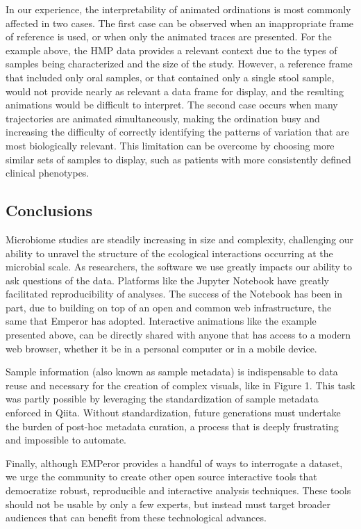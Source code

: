 In our experience, the interpretability of animated ordinations is most commonly affected in two cases. The first case can be observed when an inappropriate frame of reference is used, or when only the animated traces are presented. For the example above, the HMP data provides a relevant context due to the types of samples being characterized and the size of the study. However, a reference frame that included only oral samples, or that contained only a single stool sample, would not provide nearly as relevant a data frame for display, and the resulting animations would be difficult to interpret. The second case occurs when many trajectories are animated simultaneously, making the ordination busy and increasing the difficulty of correctly identifying the patterns of variation that are most biologically relevant. This limitation can be overcome by choosing more similar sets of samples to display, such as patients with more consistently defined clinical phenotypes.

\subsection{Conclusions}
Microbiome studies are steadily increasing in size and complexity, challenging our ability to unravel the structure of the ecological interactions occurring at the  microbial scale. As researchers, the software we use greatly impacts our ability to ask questions of the data. Platforms like the Jupyter Notebook have greatly facilitated reproducibility of analyses.  The success of the Notebook has been in part, due to building on top of an open and common web infrastructure, the same that Emperor has adopted. Interactive animations like the example presented above, can be directly shared with anyone that has access to a modern web browser, whether it be in a personal computer or in a mobile device.

Sample information (also known as sample metadata) is indispensable to data reuse and necessary for the creation of complex visuals, like in Figure 1. This task was partly possible by leveraging the standardization of sample metadata enforced in Qiita. Without standardization, future generations must undertake the burden of post-hoc metadata curation, a process that is deeply frustrating and impossible to automate.

Finally, although EMPeror provides a handful of ways to interrogate a dataset, we urge the community to create other open source interactive tools that democratize robust, reproducible and interactive analysis techniques. These tools should not be usable by only a few experts, but instead must target broader audiences that can benefit from these technological advances.

